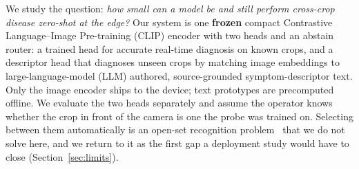 \documentclass[a4paper,fleqn]{cas-dc}
\begin{document}
We study the question: \emph{how small can a model be and still perform cross-crop disease zero-shot at
the edge?} Our system is one \textbf{frozen} compact Contrastive Language--Image Pre-training (CLIP)
encoder with two heads and an abstain router: a trained head for accurate real-time diagnosis on known
crops, and a descriptor head that diagnoses unseen crops by matching image embeddings to
large-language-model (LLM) authored, source-grounded symptom-descriptor text.
Only the image encoder ships to the device; text prototypes are precomputed offline.
We evaluate the two heads separately and assume the operator knows whether the crop in front of
the camera is one the probe was trained on. Selecting between them automatically is an open-set
recognition problem~\citep{scheirer2013openset,xian2019gzsl} that we do not solve here, and we
return to it as the first gap a deployment study would have to close (Section~\ref{sec:limits}).

\end{document}
